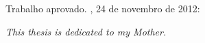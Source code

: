 \documentclass[
	12pt,				%
	openright,			%
	twoside,			%
	a4paper,			%
	english,			%
	french,				%
	spanish,			%
	brazil				%
	]{abntex2}
\begin{document}
%
% 
%
\begin{folhadeaprovacao}

  \begin{center}
    {\ABNTEXchapterfont\large\imprimirautor}

    \vspace*{\fill}\vspace*{\fill}
    \begin{center}
      \ABNTEXchapterfont\bfseries\Large\imprimirtitulo
    \end{center}
    \vspace*{\fill}
    
    \hspace{.45\textwidth}
    \begin{minipage}{.5\textwidth}
        \imprimirpreambulo
    \end{minipage}%
    \vspace*{\fill}
   \end{center}
        
   Trabalho aprovado. \imprimirlocal, 24 de novembro de 2012:

      
   \begin{center}
    \vspace*{0.5cm}
    {\large\imprimirlocal}
    \par
    {\large\imprimirdata}
    \vspace*{1cm}
  \end{center}
  
\end{folhadeaprovacao}

\begin{dedicatoria}
   \vspace*{\fill}
   \centering
   \noindent
   \textit{ This thesis is dedicated to my Mother.} \vspace*{\fill}
\end{dedicatoria}
\end{document}
